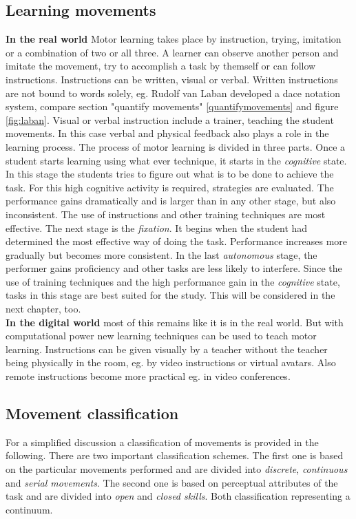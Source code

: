 \subsection{Learning movements}
\textbf{In the real world} Motor learning takes place by instruction, trying, imitation or a combination of two or all three. A learner can observe another person and imitate the movement, try to accomplish a task by themself or can follow instructions. Instructions can be written, visual or verbal. Written instructions are not bound to words solely, eg. Rudolf van Laban developed a dace notation system, compare section "quantify movements" \ref{quantifymovements} and figure \ref{fig:laban}. Visual or verbal instruction include a trainer, teaching the student movements. In this case verbal and physical feedback also plays a role in the learning process. The process of motor learning is divided in three parts. Once a student starts learning using what ever technique, it starts in the \textit{cognitive} state. In this stage the students tries to figure out what is to be done to achieve the task. For this high cognitive activity is required, strategies are evaluated. The performance gains dramatically and is larger than in any other stage, but also inconsistent. The use of instructions and other training techniques are most effective. The next stage is the \textit{fixation}. It begins when the student had determined the most effective way of doing the task. Performance increases more gradually but becomes more consistent. In the last \textit{autonomous} stage, the performer gains proficiency and other tasks are less likely to interfere. Since the use of training techniques and the high performance gain in the \textit{cognitive} state, tasks in this stage are best suited for the study. This will be considered in the next chapter, too.\\
\textbf{In the digital world} most of this remains like it is in the real world. But with computational power new learning techniques can be used to teach motor learning. Instructions can be given visually by a teacher without the teacher being physically in the room, eg. by video instructions or virtual avatars. Also remote instructions become more practical eg. in video conferences. 

\subsection{Movement classification}
For a simplified discussion a classification of movements is provided in the following. There are two important classification schemes. The first one is based on the particular movements performed and are divided into \textit{discrete}, \textit{continuous} and \textit{serial movements}. The second one is based on perceptual attributes of the task and are divided into \textit{open} and \textit{closed skills}. Both classification representing a continuum.

